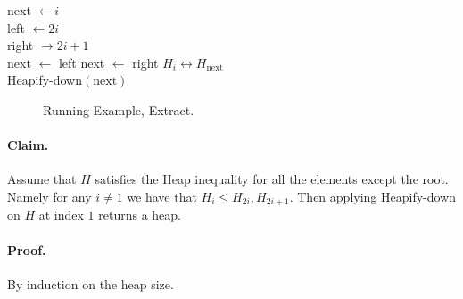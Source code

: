 \begin{algorithm}[H]
next  $\leftarrow i  $ \\
left  $\leftarrow 2i $ \\
right $\rightarrow 2i +1 $ \\ 
 {
  next $\leftarrow$ left 
}
 {
  next $\leftarrow$  right
}
 {
  $ H_{i} \leftrightarrow H_{\text{next}} $ \\ 
  Heapify-down$\left( \text{next}  \right)$
}
\end{algorithm}


 

\begin{figure}[h]
  \centering
  \begin{subfigure}[b]{0.23\textwidth}
	
  \end{subfigure}
\begin{subfigure}[b]{0.23\textwidth}
	
  \end{subfigure}
\begin{subfigure}[b]{0.23\textwidth}
	
  \end{subfigure}
\begin{subfigure}[b]{0.23\textwidth}
	
  \end{subfigure}
  \caption{Running Example, Extract.} 
\end{figure}


\paragraph{Claim.} Assume that $H$ satisfies the Heap inequality for all the elements except the root. Namely for any $i \neq 1$ we have that $H_{i} \le H_{2i}, H_{2i+1}$. Then applying Heapify-down on $H$ at index $1$ returns a heap.  
\paragraph{Proof.} By induction on the heap size.  
 
